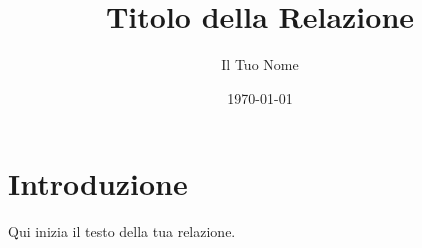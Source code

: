 \documentclass{article}
\title{Titolo della Relazione}
\author{Il Tuo Nome}
\date{\today}
\begin{document}
\maketitle

\section{Introduzione}
Qui inizia il testo della tua relazione.
\end{document}
